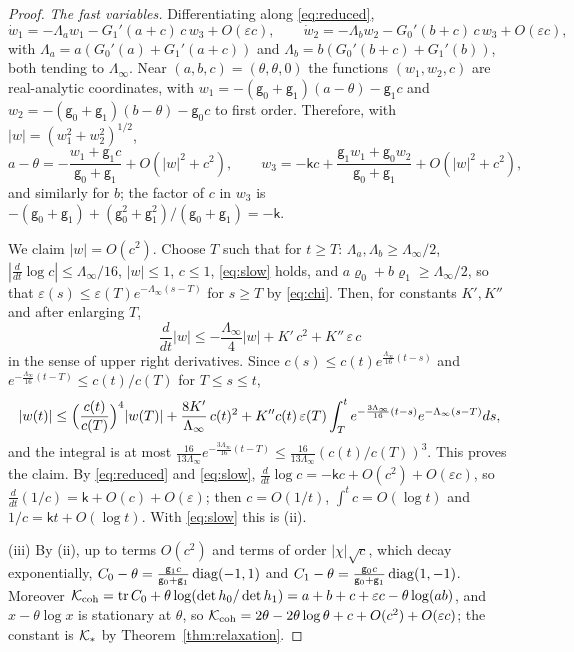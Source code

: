 \begin{proof}
\emph{The fast variables.} Differentiating along \eqref{eq:reduced},
\[
 \dot w_1=-\Lambda_aw_1-G_1'(a+c)\,c\,w_3+O(\varepsilon c),\qquad
 \dot w_2=-\Lambda_bw_2-G_0'(b+c)\,c\,w_3+O(\varepsilon c),
\]
with $\Lambda_a=a(G_0'(a)+G_1'(a+c))$ and $\Lambda_b=b(G_0'(b+c)+G_1'(b))$,
both tending to $\Lambda_\infty$. Near $(a,b,c)=(\theta,\theta,0)$ the
functions $(w_1,w_2,c)$ are real-analytic coordinates, with
$w_1=-(\mathsf g_0+\mathsf g_1)(a-\theta)-\mathsf g_1c$ and
$w_2=-(\mathsf g_0+\mathsf g_1)(b-\theta)-\mathsf g_0c$ to first order.
Therefore, with $|w|=(w_1^2+w_2^2)^{1/2}$,
\begin{equation}\label{eq:slow}
 a-\theta=-\frac{w_1+\mathsf g_1c}{\mathsf g_0+\mathsf g_1}+O(|w|^2+c^2),\qquad
 w_3=-\mathsf kc+\frac{\mathsf g_1w_1+\mathsf g_0w_2}{\mathsf g_0+\mathsf g_1}
 +O(|w|^2+c^2),
\end{equation}
and similarly for $b$; the factor of $c$ in $w_3$ is
$-(\mathsf g_0+\mathsf g_1)+(\mathsf g_0^2+\mathsf g_1^2)/(\mathsf g_0+\mathsf g_1)=-\mathsf k$.

We claim $|w|=O(c^2)$. Choose $T$ such that for $t\geq T$:
$\Lambda_a,\Lambda_b\geq\Lambda_\infty/2$,
$|\frac d{dt}\log c|\leq\Lambda_\infty/16$, $|w|\leq1$, $c\leq1$,
\eqref{eq:slow} holds, and $a\varrho_0+b\varrho_1\geq\Lambda_\infty/2$, so
that $\varepsilon(s)\leq\varepsilon(T)e^{-\Lambda_\infty(s-T)}$ for $s\geq T$
by \eqref{eq:chi}. Then, for constants $K',K''$ and after enlarging $T$,
\[
 \frac d{dt}|w|\leq-\frac{\Lambda_\infty}4|w|+K'\,c^2+K''\,\varepsilon\,c
\]
in the sense of upper right derivatives. Since
$c(s)\leq c(t)e^{\frac{\Lambda_\infty}{16}(t-s)}$ and
$e^{-\frac{\Lambda_\infty}{16}(t-T)}\leq c(t)/c(T)$ for $T\leq s\leq t$,
\[
 |w(t)|\leq\Bigl(\frac{c(t)}{c(T)}\Bigr)^4|w(T)|+\frac{8K'}{\Lambda_\infty}\,c(t)^2
 +K''c(t)\,\varepsilon(T)\int_T^te^{-\frac{3\Lambda_\infty}{16}(t-s)}e^{-\Lambda_\infty(s-T)}ds ,
\]
and the integral is at most
$\frac{16}{13\Lambda_\infty}e^{-\frac{3\Lambda_\infty}{16}(t-T)}\leq\frac{16}{13\Lambda_\infty}(c(t)/c(T))^3$.
This proves the claim. By \eqref{eq:reduced} and \eqref{eq:slow},
$\frac d{dt}\log c=-\mathsf kc+O(c^2)+O(\varepsilon c)$, so
$\frac d{dt}(1/c)=\mathsf k+O(c)+O(\varepsilon)$; then $c=O(1/t)$,
$\int^tc=O(\log t)$ and $1/c=\mathsf kt+O(\log t)$. With \eqref{eq:slow} this
is (ii).

(iii) By (ii), up to terms $O(c^2)$ and terms of order
$|\chi|\sqrt c$, which decay exponentially,
$C_0-\theta=\frac{\mathsf g_1c}{\mathsf g_0+\mathsf g_1}\operatorname{diag}(-1,1)$ and
$C_1-\theta=\frac{\mathsf g_0c}{\mathsf g_0+\mathsf g_1}\operatorname{diag}(1,-1)$. Moreover
$\mathcal K_{\mathrm{coh}}=\operatorname{tr} C_0+\theta\log(\det h_0/\det h_1)=a+b+c+\varepsilon c-\theta\log(ab)$,
and $x-\theta\log x$ is stationary at $\theta$, so
$\mathcal K_{\mathrm{coh}}=2\theta-2\theta\log\theta+c+O(c^2)+O(\varepsilon c)$; the constant
is $\mathcal K_*$ by Theorem~\ref{thm:relaxation}.


\end{proof}
